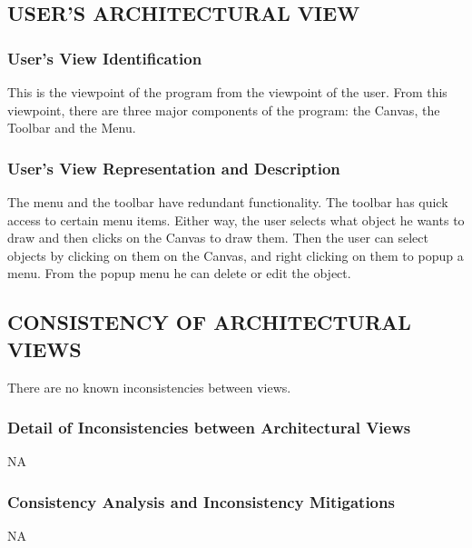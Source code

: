 \documentclass[twoside,letterpaper]{article}
\begin{document}
{\clearpage
\subsection[USER{\textquoteright}S ARCHITECTURAL
VIEW]{\bfseries\color{black}
USER{\textquoteright}S ARCHITECTURAL VIEW}

\subsubsection{User{\textquoteright}s View Identification}

{\color{black}
This is the viewpoint of the program from the viewpoint of the user.
From this viewpoint, there are three major components of the
program: the Canvas, the Toolbar and the Menu. }

\subsubsection{User{\textquoteright}s View Representation and
Description }
{\color{black}
The menu and the toolbar have redundant functionality. The toolbar has
quick access to certain menu items. Either way, the user selects what object
he wants to draw and then clicks on the Canvas to draw them. Then the user
can select objects by clicking on them on the Canvas, and right clicking
on them to popup a menu. From the popup menu he can delete or edit the object.}


\clearpage




\subsection[CONSISTENCY OF ARCHITECTURAL
VIEWS]{\bfseries\color{black} CONSISTENCY OF
ARCHITECTURAL VIEWS}
{\color{black}
There are no known inconsistencies between views. }

\subsubsection{Detail of Inconsistencies between Architectural Views}
{\color{black}
NA}

\subsubsection{Consistency Analysis and Inconsistency Mitigations}
{\color{black}
NA}

}
\end{document}
